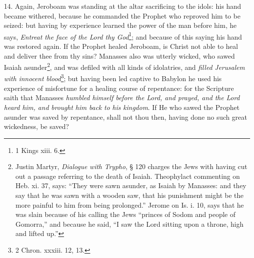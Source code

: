 14. Again, Jeroboam was standing at the altar sacrificing to the idols: his hand became withered, because he commanded the Prophet who reproved him to be seized: but having by experience learned the power of the man before him, he says, \emph{Entreat the face of the Lord thy God}\footnote{1 Kings xiii. 6.}; and because of this saying his hand was restored again. If the Prophet healed Jeroboam, is Christ not able to heal and deliver thee from thy sins? Manasses also was utterly wicked, who sawed Isaiah asunder\footnote{Justin Martyr, \emph{Dialogue with Trypho}, § 120 charges the Jews with having cut out a passage referring to the death of Isaiah. Theophylact commenting on Heb. xi. 37, says: “They were sawn asunder, as Isaiah by Manasses: and they say that he was sawn with a wooden saw, that his punishment might be the more painful to him from being prolonged.” Jerome on Is. i. 10, says that he was slain because of his calling the Jews “princes of Sodom and people of Gomorra,” and because he said, “I saw the Lord sitting upon a throne, high and lifted up.”}, and was defiled with all kinds of idolatries, and \emph{filled Jerusalem with innocent blood}\footnote{2 Chron. xxxiii. 12, 13.}; but having been led captive to Babylon he used his experience of misfortune for a healing course of repentance: for the Scripture saith that Manasses \emph{humbled himself before the Lord, and prayed, and the Lord heard him, and brought him back to his kingdom}. If He who sawed the Prophet asunder was saved by repentance, shall not thou then, having done no such great wickedness, be saved?

